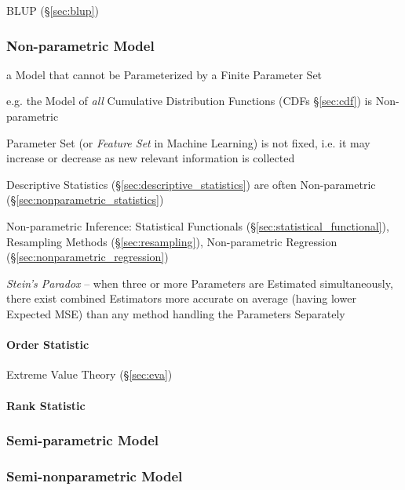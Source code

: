 BLUP (\S\ref{sec:blup})



\subsubsection{Non-parametric Model}\label{sec:nonparametric_model}

a Model that cannot be Parameterized by a Finite Parameter Set

e.g. the Model of \emph{all} Cumulative Distribution Functions (CDFs
\S\ref{sec:cdf}) is Non-parametric

Parameter Set (or \emph{Feature Set} in Machine Learning) is not fixed, i.e. it
may increase or decrease as new relevant information is collected

Descriptive Statistics (\S\ref{sec:descriptive_statistics}) are often
Non-parametric (\S\ref{sec:nonparametric_statistics})

\fist Non-parametric Inference: Statistical Functionals
(\S\ref{sec:statistical_functional}), Resampling Methods
(\S\ref{sec:resampling}), Non-parametric Regression
(\S\ref{sec:nonparametric_regression})

\emph{Stein's Paradox} -- when three or more Parameters are Estimated
simultaneously, there exist combined Estimators more accurate on average (having
lower Expected MSE) than any method handling the Parameters Separately



\paragraph{Order Statistic}\label{sec:order_statistic}\hfill

Extreme Value Theory (\S\ref{sec:eva})



\paragraph{Rank Statistic}\label{sec:rank_statistic}\hfill



\subsubsection{Semi-parametric Model}\label{sec:semiparametric_model}

\subsubsection{Semi-nonparametric Model}\label{sec:seminonparametric_model}

